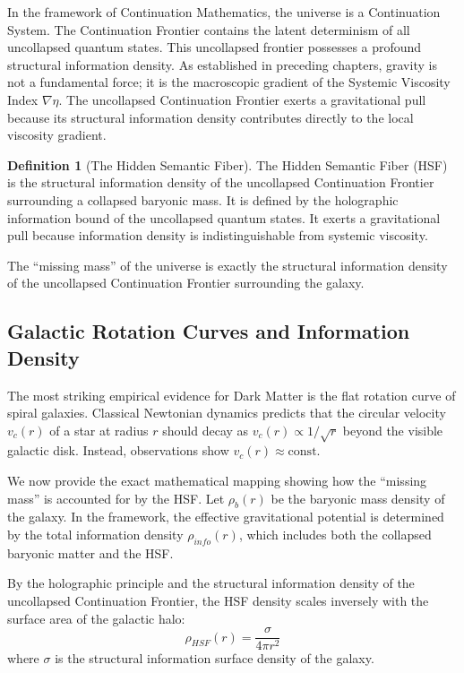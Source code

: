 \documentclass[12pt,twoside]{extbook}
\theoremstyle{definition}
\newtheorem{definition}{Definition}[chapter]
\theoremstyle{remark}
\begin{document}
In the framework of Continuation Mathematics, the universe is a Continuation System. The Continuation Frontier contains the latent determinism of all uncollapsed quantum states. This uncollapsed frontier possesses a profound structural information density. As established in preceding chapters, gravity is not a fundamental force; it is the macroscopic gradient of the Systemic Viscosity Index $\nabla \eta$. The uncollapsed Continuation Frontier exerts a gravitational pull because its structural information density contributes directly to the local viscosity gradient. 

\begin{definition}[The Hidden Semantic Fiber]
The Hidden Semantic Fiber (HSF) is the structural information density of the uncollapsed Continuation Frontier surrounding a collapsed baryonic mass. It is defined by the holographic information bound of the uncollapsed quantum states. It exerts a gravitational pull because information density is indistinguishable from systemic viscosity.
\end{definition}

The ``missing mass'' of the universe is exactly the structural information density of the uncollapsed Continuation Frontier surrounding the galaxy.

\subsection{Galactic Rotation Curves and Information Density}
The most striking empirical evidence for Dark Matter is the flat rotation curve of spiral galaxies. Classical Newtonian dynamics predicts that the circular velocity $v_c(r)$ of a star at radius $r$ should decay as $v_c(r) \propto 1/\sqrt{r}$ beyond the visible galactic disk. Instead, observations show $v_c(r) \approx \text{const}$.

We now provide the exact mathematical mapping showing how the ``missing mass'' is accounted for by the HSF. Let $\rho_b(r)$ be the baryonic mass density of the galaxy. In the framework, the effective gravitational potential is determined by the total information density $\rho_{info}(r)$, which includes both the collapsed baryonic matter and the HSF.

By the holographic principle and the structural information density of the uncollapsed Continuation Frontier, the HSF density scales inversely with the surface area of the galactic halo:
\begin{equation}
\rho_{HSF}(r) = \frac{\sigma}{4\pi r^2}
\end{equation}
where $\sigma$ is the structural information surface density of the galaxy.
\end{document}
